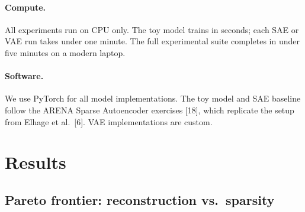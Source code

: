 \documentclass{article}
\begin{document}
\paragraph{Compute.}
All experiments run on CPU only. The toy model trains in seconds; each SAE or VAE run takes under one minute. The full experimental suite completes in under five minutes on a modern laptop.

\paragraph{Software.}
We use PyTorch for all model implementations. The toy model and SAE baseline follow the ARENA Sparse Autoencoder exercises [18], which replicate the setup from Elhage et al.~[6]. VAE implementations are custom.


\section{Results}
\label{sec:results}

\subsection{Pareto frontier: reconstruction vs.\ sparsity}
\label{sec:pareto}
\end{document}
